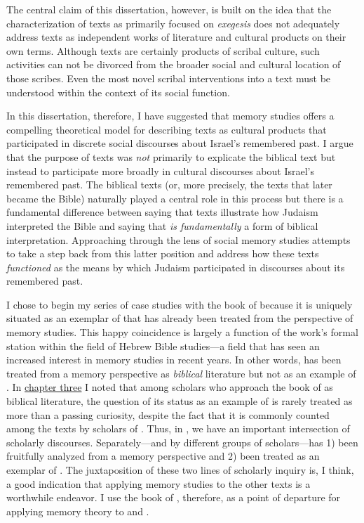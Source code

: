 The central claim of this dissertation, however, is built on the idea that the characterization of \rwb texts as primarily focused on \emph{exegesis} does not adequately address \rwb texts as independent works of literature and cultural products on their own terms. Although \rwb texts are certainly products of scribal culture, such activities can not be divorced from the broader social and cultural location of those scribes. Even the most novel scribal interventions into a text must be understood within the context of its social function.

In this dissertation, therefore, I have suggested that memory studies offers a compelling theoretical model for describing \rwb texts as cultural products that participated in discrete social discourses about Israel's remembered past. I argue that the purpose of \rwb texts was \emph{not} primarily to explicate the biblical text but instead to participate more broadly in cultural discourses about Israel's remembered past. The biblical texts (or, more precisely, the texts that later became the Bible) naturally played a central role in this process but there is a fundamental difference between saying that \rwb texts illustrate how \secondtemple Judaism interpreted the Bible and saying that \rwb \emph{is fundamentally} a form of biblical interpretation. Approaching \rwb through the lens of social memory studies attempts to take a step back from this latter position and address how these texts \emph{functioned} as the means by which \secondtemple Judaism participated in discourses about its remembered past.

I chose to begin my series of case studies with the book of \chronicles because it is uniquely situated as an exemplar of \rwb that has already been treated from the perspective of memory studies. This happy coincidence is largely a function of the work's formal station within the field of Hebrew Bible studies---a field that has seen an increased interest in memory studies in recent years. In other words, \chronicles has been treated from a memory perspective as \emph{biblical} literature but not as an example of \rwb. In \hyperref[chap:chronicles]{chapter three} I noted that among scholars who approach the book of \chronicles as biblical literature, the question of its status as an example of \rwb is rarely treated as more than a passing curiosity, despite the fact that it is commonly counted among the \rwb texts by scholars of \rwb. Thus, in \chronicles, we have an important intersection of scholarly discourses. Separately---and by different groups of scholars---\chronicles has 1) been fruitfully analyzed from a memory perspective and 2) been treated as an exemplar of \rwb. The juxtaposition of these two lines of scholarly inquiry is, I think, a good indication that applying memory studies to the other \rwb texts is a worthwhile endeavor. I use the book of \chronicles, therefore, as a point of departure for applying memory theory to \ga and \jub. 


